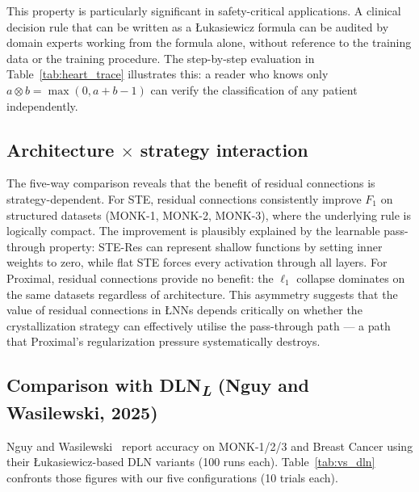\documentclass[lettersize,journal]{IEEEtran}
\newcommand{\tnorm}{\otimes}      %
\newcommand{\LNN}{\L{}NN}
\begin{document}
This property is particularly significant in safety-critical applications.
A clinical decision rule that can be written as a \L{}ukasiewicz formula can
be audited by domain experts working from the formula alone, without reference
to the training data or the training procedure.
The step-by-step evaluation in Table~\ref{tab:heart_trace} illustrates this:
a reader who knows only $a \tnorm b = \max(0, a+b-1)$ can verify the
classification of any patient independently.

\subsection{Architecture \texorpdfstring{$\times$}{×} strategy interaction}

The five-way comparison reveals that the benefit of residual connections is
strategy-dependent.
For STE, residual connections consistently improve $F_1$ on structured datasets
(MONK-1, MONK-2, MONK-3), where the underlying rule is logically compact.
The improvement is plausibly explained by the learnable pass-through property:
STE-Res can represent shallow functions by setting inner weights to zero, while
flat STE forces every activation through all layers.
For Proximal, residual connections provide no benefit: the $\ell_1$ collapse
dominates on the same datasets regardless of architecture.
This asymmetry suggests that the value of residual connections in \LNN{}s
depends critically on whether the crystallization strategy can effectively
utilise the pass-through path --- a path that Proximal's regularization
pressure systematically destroys.

\subsection{Comparison with DLN\textsubscript{\textit{L}} (Nguy and Wasilewski, 2025)}
\label{ssec:vs_dln}

Nguy and Wasilewski~\cite{nguy2025} report accuracy on MONK-1/2/3 and Breast
Cancer using their \L{}ukasiewicz-based DLN variants (100 runs each).
Table~\ref{tab:vs_dln} confronts those figures with our five configurations
(10 trials each).
\end{document}
